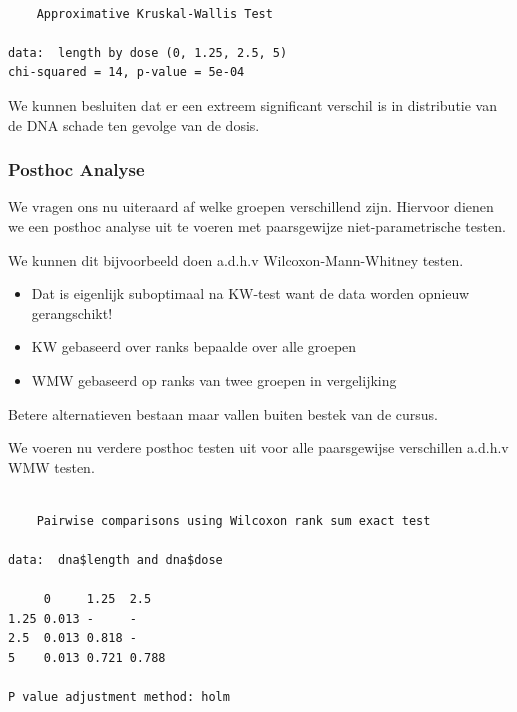 \documentclass[
  dutch,
  letterpaper,
  12pt]{book}
\newenvironment{Shaded}{\begin{snugshade}}{\end{snugshade}}
\newcommand{\FunctionTok}[1]{\textcolor[rgb]{0.28,0.35,0.67}{#1}}
\newcommand{\NormalTok}[1]{\textcolor[rgb]{0.00,0.23,0.31}{#1}}
\newcommand{\OtherTok}[1]{\textcolor[rgb]{0.00,0.23,0.31}{#1}}
\newcommand{\SpecialCharTok}[1]{\textcolor[rgb]{0.37,0.37,0.37}{#1}}
\providecommand{\tightlist}{%
  \setlength{\itemsep}{0pt}\setlength{\parskip}{0pt}}
\theoremstyle{definition}
\theoremstyle{definition}
\theoremstyle{definition}
\theoremstyle{remark}
\begin{document}
\begin{verbatim}

    Approximative Kruskal-Wallis Test

data:  length by dose (0, 1.25, 2.5, 5)
chi-squared = 14, p-value = 5e-04
\end{verbatim}

We kunnen besluiten dat er een extreem significant verschil is in
distributie van de DNA schade ten gevolge van de dosis.

\subsubsection{Posthoc Analyse}\label{posthoc-analyse}

We vragen ons nu uiteraard af welke groepen verschillend zijn. Hiervoor
dienen we een posthoc analyse uit te voeren met paarsgewijze
niet-parametrische testen.

We kunnen dit bijvoorbeeld doen a.d.h.v Wilcoxon-Mann-Whitney testen.

\begin{itemize}
\tightlist
\item
  Dat is eigenlijk suboptimaal na KW-test want de data worden opnieuw
  gerangschikt!
\item
  KW gebaseerd over ranks bepaalde over alle groepen
\item
  WMW gebaseerd op ranks van twee groepen in vergelijking
\end{itemize}

Betere alternatieven bestaan maar vallen buiten bestek van de cursus.

We voeren nu verdere posthoc testen uit voor alle paarsgewijse
verschillen a.d.h.v WMW testen.

\begin{Shaded}
\end{Shaded}

\begin{verbatim}

    Pairwise comparisons using Wilcoxon rank sum exact test 

data:  dna$length and dna$dose 

     0     1.25  2.5  
1.25 0.013 -     -    
2.5  0.013 0.818 -    
5    0.013 0.721 0.788

P value adjustment method: holm 
\end{verbatim}
\end{document}

